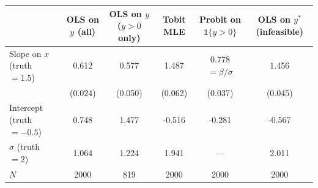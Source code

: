 \begin{tabular}{lccccc}\toprule
 & OLS on $y$ (all) & OLS on $y$ ($y > 0$ only) & Tobit MLE & Probit on $\mathbb{1}\{y>0\}$ & OLS on $y^*$ (infeasible) \\ \midrule
Slope on $x$ (truth $= 1.5$) & 0.612 & 0.577 & 1.487 & 0.778 $= \beta/\sigma$ & 1.456 \\
 & (0.024) & (0.050) & (0.062) & (0.037) & (0.045) \\
Intercept (truth $= -0.5$) & 0.748 & 1.477 & -0.516 & -0.281 & -0.567 \\
$\hat\sigma$ (truth $= 2$) & 1.064 & 1.224 & 1.941 & --- & 2.011 \\
$N$ & 2000 & 819 & 2000 & 2000 & 2000 \\
\bottomrule\end{tabular}
